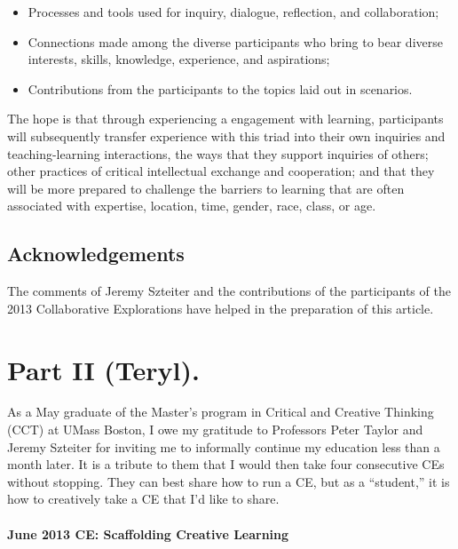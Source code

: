 \begin{itemize}
\itemsep1pt\parskip0pt
\item
  Processes and tools used for inquiry, dialogue, reflection, and
  collaboration;
\item
  Connections made among the diverse participants who bring to bear
  diverse interests, skills, knowledge, experience, and aspirations;
\item
  Contributions from the participants to the topics laid out in
  scenarios.
\end{itemize}

The hope is that through experiencing a engagement with learning,
participants will subsequently transfer experience with this triad into
their own inquiries and teaching-learning interactions, the ways that
they support inquiries of others; other practices of critical
intellectual exchange and cooperation; and that they will be more
prepared to challenge the barriers to learning that are often associated
with expertise, location, time, gender, race, class, or age.

\subsection{Acknowledgements}\label{acknowledgements}

The comments of Jeremy Szteiter and the contributions of the
participants of the 2013 Collaborative Explorations have helped in the
preparation of this article.

\section*{Part II (Teryl).}\label{part-ii-teryl.}

As a May graduate of the Master's program in Critical and Creative
Thinking (CCT) at UMass Boston, I owe my gratitude to Professors Peter
Taylor and Jeremy Szteiter for inviting me to informally continue my
education less than a month later. It is a tribute to them that I would
then take four consecutive CEs without stopping. They can best share how
to run a CE, but as a ``student,'' it is how to creatively take a CE
that I'd like to share.

\paragraph{June 2013 CE: Scaffolding Creative
Learning}\label{june-2013-ce-scaffolding-creative-learning}

